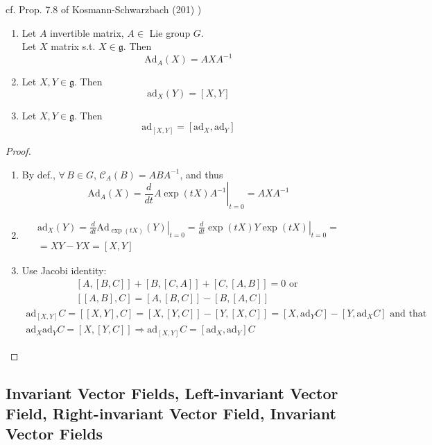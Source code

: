 cf. Prop. 7.8 of Kosmann-Schwarzbach (201) \cite{dgdt:YKosmann-Schwarzbach2010})
\begin{proposition}
	\begin{enumerate}
		\item Let $A$ invertible matrix, $A \in $ Lie group $G$.  \\
		Let $X$ matrix s.t. $X \in \mathfrak{g}$.  Then
		\[
		\text{Ad}_A(X) = AXA^{-1}
		\]
		\item Let $X,Y \in \mathfrak{g}$.  Then 
		\[
		\text{ad}_X(Y) = [X,Y]
		\]
		\item Let $X,Y \in \mathfrak{g}$.  Then 
		\[
		\text{ad}_{[X,Y]} = [ \text{ad}_X, \text{ad}_Y ]
		\]
	\end{enumerate}
\end{proposition}
\begin{proof}
	\begin{enumerate}
		\item By def., $\forall \, B \in G$, $\mathcal{C}_A(B) = ABA^{-1}$, and thus
		\[
		\text{Ad}_A(X) = \left. \frac{d}{dt} A\exp{ (tX)  }A^{-1} \right|_{t=0} = AXA^{-1}
		\]
		\item \[
		\begin{gathered}
		\text{ad}_X(Y) = \left. \frac{d}{dt} \text{Ad}_{\exp{(tX)}}(Y) \right|_{t=0} = \left. \frac{d}{dt} \exp{(tX)} Y \exp{(tX)} \right|_{t=0} = \\
		= XY - YX = [X,Y] 
		\end{gathered}
		\]
		\item Use Jacobi identity: 
		\[
		\begin{gathered}
		[A,[B,C]] +  [B,[C,A]] +  [C,[A,B]] = 0 \text{ or } \\ 
		[[A,B],C] = [A,[B,C]] - [B,[A,C]]
		\end{gathered}
		\] 
		\[
		\begin{gathered}
		\text{ad}_{[X,Y]}C = [[X,Y],C] = [X,[Y,C]] - [Y,[X,C]] = [X,\text{ad}_YC] - [Y,\text{ad}_XC] \text{ and that } \\ 
		\text{ad}_X\text{ad}_Y C = [X,[Y,C]] \Longrightarrow \text{ad}_{[X,Y]}C = [\text{ad}_X,\text{ad}_Y ] C
		\end{gathered}
		\]
	\end{enumerate}
\end{proof}

\subsection{Invariant Vector Fields, Left-invariant Vector Field, Right-invariant Vector Field, Invariant Vector Fields}


